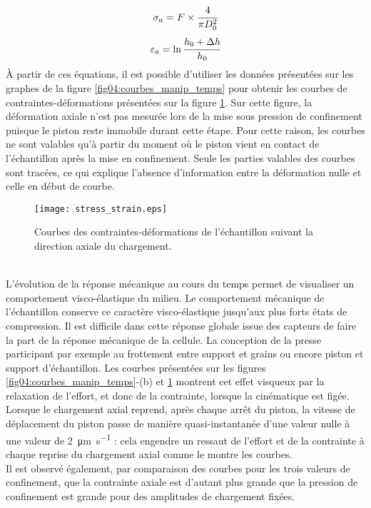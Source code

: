		\begin{equation}\label{eq04:contrainte_echantillon}
			\sigma_a = F \times \cfrac{4}{\pi D_0^2}
		\end{equation}
		\begin{equation}\label{eq04:defo_echantillon}
			\varepsilon_a = \ln\cfrac{h_0+\Delta h}{h_0}
		\end{equation}
		\`A partir de ces équations, il est possible d'utiliser les données présentées sur les graphes de la figure \ref{fig04:courbes_manip_temps} pour obtenir les courbes de contraintes-déformations présentées sur la figure \ref{fig04:courbes_manip_contrainte_defo}. Sur cette figure, la déformation axiale n'est pas mesurée lors de la mise sous pression de confinement puisque le piston reste immobile durant cette étape. Pour cette raison, les courbes ne sont valables qu'à partir du moment où le piston vient en contact de l'échantillon après la mise en confinement. Seule les parties valables des courbes sont tracées, ce qui explique l'absence d'information entre la déformation nulle et celle en début de courbe.
		\begin{figure}\centering
			\texttt{[image: stress\_strain.eps]}
			\caption{\label{fig04:courbes_manip_contrainte_defo}Courbes des contraintes-déformations de l'échantillon suivant la direction axiale du chargement.}
		\end{figure}
		\\L’évolution de la réponse mécanique au cours du temps permet de visualiser un comportement visco-élastique du milieu. Le comportement mécanique de l’échantillon conserve ce caractère visco-élastique jusqu’aux plus forts états de compression. Il est difficile dans cette réponse globale issue des capteurs de faire la part de la réponse mécanique de la cellule. La conception de la presse participant par exemple au frottement entre support et grains ou encore piston et support d’échantillon. Les courbes présentées sur les figures \ref{fig04:courbes_manip_temps}-(b) et \ref{fig04:courbes_manip_contrainte_defo} montrent cet effet visqueux par la relaxation de l'effort, et donc de la contrainte, lorsque la cinématique est figée. Lorsque le chargement axial reprend, après chaque arrêt du piston, la vitesse de déplacement du piston passe de manière quasi-instantanée d'une valeur nulle à une valeur de \SI{2}{\micro\meter\per\second} : cela engendre un ressaut de l'effort et de la contrainte à chaque reprise du chargement axial comme le montre les courbes.
		\\Il est observé également, par comparaison des courbes pour les trois valeurs de confinement, que la contrainte axiale est d'autant plus grande que la pression de confinement est grande pour des amplitudes de chargement fixées.
